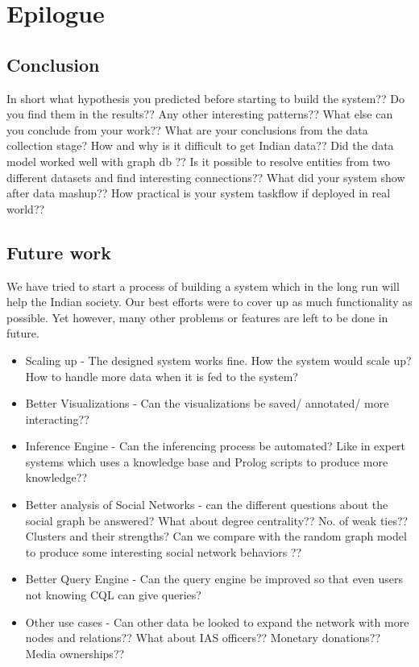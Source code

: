 \chapter{Epilogue}
\section{Conclusion}
 In short what hypothesis you predicted before starting to build the system?? Do you find them in the results?? Any other interesting patterns?? 
What else can you conclude from your work?? What are your conclusions from the data collection stage? How and why is it difficult to get Indian data?? Did the data model worked well with graph db ?? Is it possible to resolve entities from two different datasets and find interesting connections??  What did your system show after data mashup?? How practical is your system taskflow if deployed in real world??

\section{Future work}
We have tried to start a process of building a system which in the long run will help the Indian society. Our best efforts were to cover up as much functionality as possible. Yet however, many other problems or features are left to be done in future.
\begin{itemize}
\item Scaling up - The designed system works fine. How the system would scale up? How to handle more data when it is fed to the system?
\item Better Visualizations - Can the visualizations be saved/ annotated/ more interacting??
\item Inference Engine - Can the inferencing process be automated? Like in expert systems which uses a knowledge base and Prolog scripts to produce more knowledge??
\item Better analysis of Social Networks - can the different questions about the social graph be answered? What about degree centrality?? No. of weak ties?? Clusters and their strengths? Can we compare with the random graph model to produce some interesting social network behaviors ??
\item Better Query Engine - Can the query engine be improved so that even users not knowing CQL can give queries?
\item Other use cases - Can other data be looked to expand the network with more nodes and relations?? What about IAS officers?? Monetary donations?? Media ownerships??
\end{itemize}
